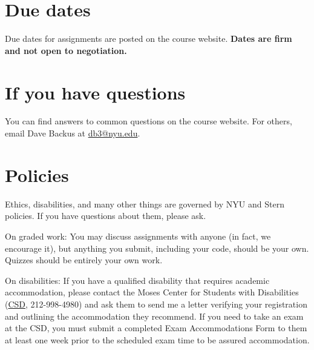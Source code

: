 \documentclass[11pt]{article}
\begin{document}
\section*{Due dates}

Due dates for assignments are posted on the course website.
{\bf Dates are firm and not open to negotiation.}


\section*{If you have questions}

You can find answers to common questions on the course website.
%
%
For others, email Dave Backus at
\href{mailto:db3@nyu.edu}{db3@nyu.edu}.



\section*{Policies}

Ethics, disabilities, and many other things are governed by NYU
and Stern policies.
If you have questions about them, please ask.

On graded work:
You may discuss assignments with anyone (in fact, we encourage it),
but anything you submit, including your code, should be your own.
Quizzes should be entirely your own work.

On disabilities:
If you have a qualified disability that requires academic accommodation,
please contact the Moses Center for Students with Disabilities
(\href{http://www.nyu.edu/life/safety-health-wellness/students-with-disabilities.html}{CSD},
212-998-4980) and ask them to
send me a letter verifying your registration and outlining the accommodation they recommend.
If you need to take an exam at the CSD,
you must submit a completed Exam Accommodations Form to them
at least one week prior to the scheduled exam time to be assured accommodation.



\end{document}
